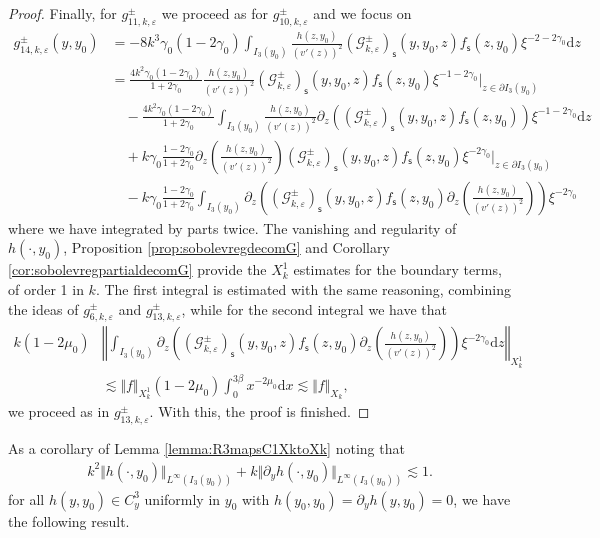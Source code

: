 \documentclass[11pt,reqno]{amsproc}
\theoremstyle{definition}
\numberwithin{equation}{section}
\newcommand{\G}{{\mathcal{G}}}
\newcommand{\s}{{\mathsf{s}}}
\renewcommand{\d}{\mathrm{d}}
\newcommand{\ep}{\varepsilon}
\begin{document}
\begin{proof}
Finally, for $g_{11,k,\ep}^\pm$ we proceed as for $g_{10,k,\ep}^\pm$ and we focus on 
\begin{align*}
g_{14,k,\ep}^\pm(y,y_0) &= -8k^3\gamma_0(1-2\gamma_0)\int_{I_3(y_0)} \frac{h(z,y_0)}{(v'(z))^2}  \left(\G_{k,\ep}^\pm \right)_\s(y,y_0,z) f_\s(z,y_0) \xi^{-2-2\gamma_0} \d z \\ 
&= \frac{4k^2\gamma_0(1-2\gamma_0)}{1+2\gamma_0}\frac{h(z,y_0)}{(v'(z))^2}  \left(\G_{k,\ep}^\pm \right)_\s(y,y_0,z) f_\s(z,y_0) \xi^{-1-2\gamma_0}\Big|_{z\in \partial I_3(y_0)} \\
&\quad - \frac{4k^2\gamma_0(1-2\gamma_0)}{1+2\gamma_0}\int_{I_3(y_0)} \frac{h(z,y_0)}{(v'(z))^2}  \partial_z \left( \left(\G_{k,\ep}^\pm \right)_\s(y,y_0,z) f_\s(z,y_0) \right) \xi^{-1-2\gamma_0} \d z \\
&\quad + k\gamma_0\frac{1-2\gamma_0}{1+2\gamma_0} \partial_z \left(\frac{h(z,y_0)}{(v'(z))^2} \right)  \left(\G_{k,\ep}^\pm \right)_\s(y,y_0,z) f_\s(z,y_0) \xi^{-2\gamma_0}\Big|_{z\in \partial I_3(y_0)} \\
&\quad - k\gamma_0\frac{1-2\gamma_0}{1+2\gamma_0}\int_{I_3(y_0)} \partial_z \left(  \left(\G_{k,\ep}^\pm \right)_\s(y,y_0,z) f_\s(z,y_0) \partial_z \left(\frac{h(z,y_0)}{(v'(z))^2} \right)  \right) \xi^{-2\gamma_0}
\end{align*}
where we have integrated by parts twice. The vanishing and regularity of $h(\cdot,y_0)$, Proposition \ref{prop:sobolevregdecomG} and Corollary \ref{cor:sobolevregpartialdecomG} provide the $X_k^1$ estimates for the boundary terms, of order 1 in $k$. The first integral is estimated with the same reasoning, combining the ideas of $g_{6,k,\ep}^\pm$ and $g_{13,k,\ep}^\pm$, while for the second integral we have that 
\begin{align*}
k(1-2\mu_0)&\left\Vert \int_{I_3(y_0)}\partial_z \left(  \left(\G_{k,\ep}^\pm \right)_\s(y,y_0,z) f_\s(z,y_0) \partial_z \left(\frac{h(z,y_0)}{(v'(z))^2} \right)  \right) \xi^{-2\gamma_0}\d z \right\Vert_{X_k^1}\\
&\lesssim \Vert f \Vert_{X_k^1}(1-2\mu_0)\int_0^{3\beta} x^{-2\mu_0}\d x \lesssim \Vert f \Vert_{X_k},
\end{align*}
 we proceed as in $g_{13,k,\ep}^\pm$. With this, the proof is finished.
\end{proof}

As a corollary of Lemma \ref{lemma:R3mapsC1XktoXk} noting that 
\begin{align*}
k^2\Vert h(\cdot,y_0) \Vert_{L^\infty(I_3(y_0))} + k\Vert \partial_y h(\cdot, y_0) \Vert_{L^\infty(I_3(y_0))} \lesssim 1.
\end{align*}
for all $h(y,y_0)\in C^3_y$ uniformly in $y_0$ with $h(y_0,y_0) = \partial_y h(y,y_0)=0$, we have the following result.
\end{document}

